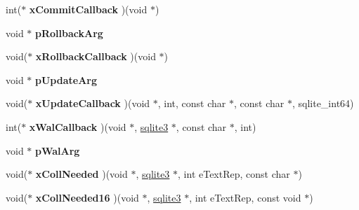 \begin{DoxyCompactItemize}
\item 
int($\ast$ {\bfseries x\+Commit\+Callback} )(void $\ast$)\hypertarget{structsqlite3_aafa01826b1329161f4fd7ed9a2579a93}{}\label{structsqlite3_aafa01826b1329161f4fd7ed9a2579a93}

\item 
void $\ast$ {\bfseries p\+Rollback\+Arg}\hypertarget{structsqlite3_a3215967241f15d4599132a8dc2adfb93}{}\label{structsqlite3_a3215967241f15d4599132a8dc2adfb93}

\item 
void($\ast$ {\bfseries x\+Rollback\+Callback} )(void $\ast$)\hypertarget{structsqlite3_a695c32708202c35cdc35a30ca40e1b6f}{}\label{structsqlite3_a695c32708202c35cdc35a30ca40e1b6f}

\item 
void $\ast$ {\bfseries p\+Update\+Arg}\hypertarget{structsqlite3_ab4269aa44fea9906fe94045336f13d2a}{}\label{structsqlite3_ab4269aa44fea9906fe94045336f13d2a}

\item 
void($\ast$ {\bfseries x\+Update\+Callback} )(void $\ast$, int, const char $\ast$, const char $\ast$, sqlite\+\_\+int64)\hypertarget{structsqlite3_ab562a95a332023d861369ece9591dc3a}{}\label{structsqlite3_ab562a95a332023d861369ece9591dc3a}

\item 
int($\ast$ {\bfseries x\+Wal\+Callback} )(void $\ast$, \hyperlink{structsqlite3}{sqlite3} $\ast$, const char $\ast$, int)\hypertarget{structsqlite3_a19a404745ce0b4f13cb29a445281288d}{}\label{structsqlite3_a19a404745ce0b4f13cb29a445281288d}

\item 
void $\ast$ {\bfseries p\+Wal\+Arg}\hypertarget{structsqlite3_aa75309c2e522cf0f6ccbd7a3c38e1075}{}\label{structsqlite3_aa75309c2e522cf0f6ccbd7a3c38e1075}

\item 
void($\ast$ {\bfseries x\+Coll\+Needed} )(void $\ast$, \hyperlink{structsqlite3}{sqlite3} $\ast$, int e\+Text\+Rep, const char $\ast$)\hypertarget{structsqlite3_a3312d02b28a6743f2f703d363c7c4f9b}{}\label{structsqlite3_a3312d02b28a6743f2f703d363c7c4f9b}

\item 
void($\ast$ {\bfseries x\+Coll\+Needed16} )(void $\ast$, \hyperlink{structsqlite3}{sqlite3} $\ast$, int e\+Text\+Rep, const void $\ast$)\hypertarget{structsqlite3_a531dea6bd5cf5f13a8f17c66bf66ac92}{}\label{structsqlite3_a531dea6bd5cf5f13a8f17c66bf66ac92}


\end{DoxyCompactItemize}
